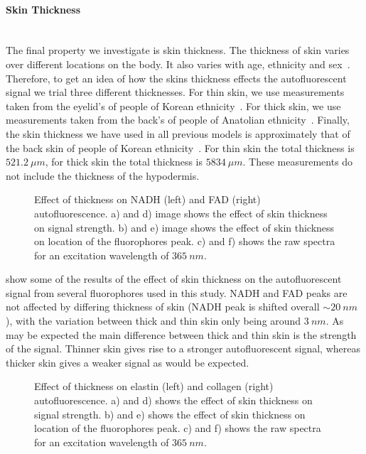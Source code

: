 \FloatBarrier
\paragraph*{Skin Thickness}\hspace{0pt}\\
The final property we investigate is skin thickness.
The thickness of skin varies over different locations on the body.
It also varies with age, ethnicity and sex~\cite{lee2002skin,oltulu2018measurement,southwood1955thickness}.
Therefore, to get an idea of how the skins thickness effects the autofluorescent signal we trial three different thicknesses.
For thin skin, we use measurements taken from the eyelid's of people of Korean ethnicity~\cite{lee2002skin}.
For thick skin, we use measurements taken from the back's of people of Anatolian ethnicity~\cite{oltulu2018measurement}.
Finally, the skin thickness we have used in all previous models is approximately that of the back skin of people of Korean ethnicity~\cite{lee2002skin}.
For thin skin the total thickness is $521.2~\mu m$, for thick skin the total thickness is $5834~\mu m$.
These measurements do not include the thickness of the hypodermis.

\begin{figure}[!htbp]
    \centering
    \caption{Effect of thickness on NADH (left) and FAD (right) autofluorescence. a) and d) image shows the effect of skin thickness on signal strength. b) and e) image shows the effect of skin thickness on location of the fluorophores peak. c) and f) shows the raw spectra for an excitation wavelength of $365~nm$.}%
    \label{fig:nadhfad-thick}%
\end{figure}

 show some of the results of the effect of skin thickness on the autofluorescent signal from several fluorophores used in this study.
NADH and FAD peaks are not affected by differing thickness of skin (NADH peak is shifted overall $\sim20~nm$), with the variation between thick and thin skin only being around $3~nm$.
As may be expected the main difference between thick and thin skin is the strength of the signal.
Thinner skin gives rise to a stronger autofluorescent signal, whereas thicker skin gives a weaker signal as would be expected.

\begin{figure}[!htbp]
    \centering
    \caption{Effect of thickness on elastin (left) and collagen (right) autofluorescence. a) and d) shows the effect of skin thickness on signal strength. b) and e) shows the effect of skin thickness on location of the fluorophores peak. c) and f) shows the raw spectra for an excitation wavelength of $365~nm$.}%
    \label{fig:elscol-thick}%
\end{figure}


